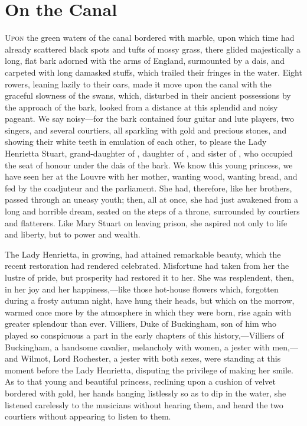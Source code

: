 \chapter{On the Canal}

\lettrine{U}{pon} the green waters of the canal bordered with marble, upon which time had already scattered black spots and tufts of mossy grass, there glided majestically a long, flat bark adorned with the arms of England, surmounted by a dais, and carpeted with long damasked stuffs, which trailed their fringes in the water. Eight rowers, leaning lazily to their oars, made it move upon the canal with the graceful slowness of the swans, which, disturbed in their ancient possessions by the approach of the bark, looked from a distance at this splendid and noisy pageant. We say noisy—for the bark contained four guitar and lute players, two singers, and several courtiers, all sparkling with gold and precious stones, and showing their white teeth in emulation of each other, to please the Lady Henrietta Stuart, grand-daughter of , daughter of , and sister of , who occupied the seat of honour under the dais of the bark. We know this young princess, we have seen her at the Louvre with her mother, wanting wood, wanting bread, and fed by the coadjuteur and the parliament. She had, therefore, like her brothers, passed through an uneasy youth; then, all at once, she had just awakened from a long and horrible dream, seated on the steps of a throne, surrounded by courtiers and flatterers. Like Mary Stuart on leaving prison, she aspired not only to life and liberty, but to power and wealth.

The Lady Henrietta, in growing, had attained remarkable beauty, which the recent restoration had rendered celebrated. Misfortune had taken from her the lustre of pride, but prosperity had restored it to her. She was resplendent, then, in her joy and her happiness,—like those hot-house flowers which, forgotten during a frosty autumn night, have hung their heads, but which on the morrow, warmed once more by the atmosphere in which they were born, rise again with greater splendour than ever. Villiers, Duke of Buckingham, son of him who played so conspicuous a part in the early chapters of this history,—Villiers of Buckingham, a handsome cavalier, melancholy with women, a jester with men,—and Wilmot, Lord Rochester, a jester with both sexes, were standing at this moment before the Lady Henrietta, disputing the privilege of making her smile. As to that young and beautiful princess, reclining upon a cushion of velvet bordered with gold, her hands hanging listlessly so as to dip in the water, she listened carelessly to the musicians without hearing them, and heard the two courtiers without appearing to listen to them.

